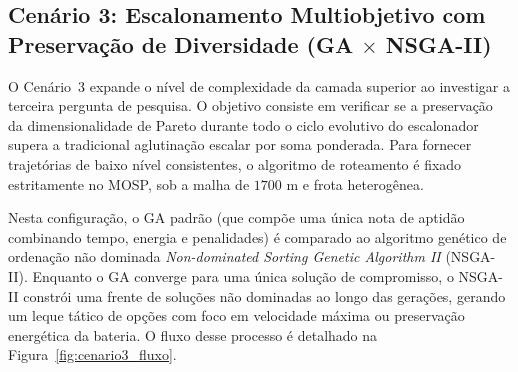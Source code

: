 \subsection{Cenário 3: Escalonamento Multiobjetivo com Preservação de Diversidade (GA $\times$ NSGA-II)}\label{sec:cenario3}

O Cenário~3 expande o nível de complexidade da camada superior ao investigar a terceira pergunta de pesquisa. O objetivo consiste em verificar se a preservação da dimensionalidade de Pareto durante todo o ciclo evolutivo do escalonador supera a tradicional aglutinação escalar por soma ponderada. Para fornecer trajetórias de baixo nível consistentes, o algoritmo de roteamento é fixado estritamente no MOSP, sob a malha de $1700\text{ m}$ e frota heterogênea.

Nesta configuração, o GA padrão (que compõe uma única nota de aptidão combinando tempo, energia e penalidades) é comparado ao algoritmo genético de ordenação não dominada \textit{Non-dominated Sorting Genetic Algorithm II} (NSGA-II). Enquanto o GA converge para uma única solução de compromisso, o NSGA-II constrói uma frente de soluções não dominadas ao longo das gerações, gerando um leque tático de opções com foco em velocidade máxima ou preservação energética da bateria. O fluxo desse processo é detalhado na Figura~\ref{fig:cenario3_fluxo}.

